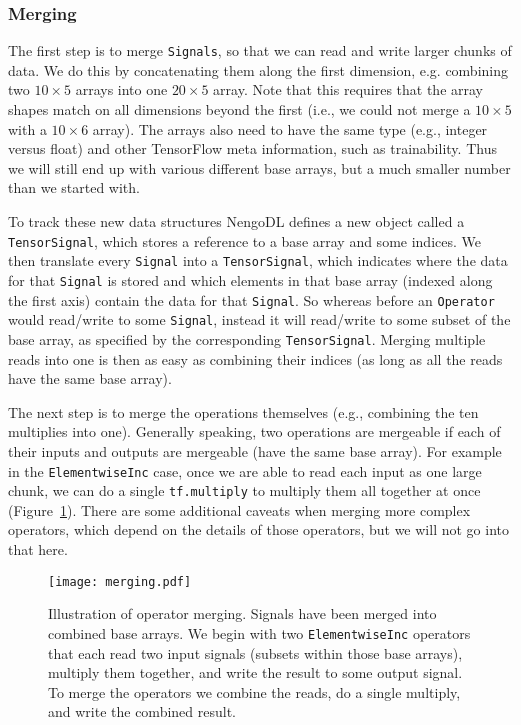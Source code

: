 \documentclass{article}
\begin{document}
\subsubsection{Merging}
\label{sec:merging}

The first step is to merge \texttt{Signals}, so that we can read and write larger chunks of data.  We do this by concatenating them along the first dimension, e.g. combining two $10 \times 5$ arrays into one $20 \times 5$ array.  Note that this requires that the array shapes match on all dimensions beyond the first (i.e., we could not merge a $10 \times 5$ with a $10 \times 6$ array).  The arrays also need to have the same type (e.g., integer versus float) and other TensorFlow meta information, such as trainability.  Thus we will still end up with various different base arrays, but a much smaller number than we started with.

To track these new data structures NengoDL defines a new object called a \texttt{TensorSignal}, which stores a reference to a base array and some indices.  We then translate every \texttt{Signal} into a \texttt{TensorSignal}, which indicates where the data for that \texttt{Signal} is stored and which elements in that base array (indexed along the first axis) contain the data for that \texttt{Signal}.  So whereas before an \texttt{Operator} would read/write to some \texttt{Signal}, instead it will read/write to some subset of the base array, as specified by the corresponding \texttt{TensorSignal}.  Merging multiple reads into one is then as easy as combining their indices (as long as all the reads have the same base array).

The next step is to merge the operations themselves (e.g., combining the ten multiplies into one).  Generally speaking, two operations are mergeable if each of their inputs and outputs are mergeable (have the same base array).  For example in the \texttt{ElementwiseInc} case, once we are able to read each input as one large chunk, we can do a single \texttt{tf.multiply} to multiply them all together at once (Figure~\ref{fig:merging}).  There are some additional caveats when merging more complex operators, which depend on the details of those operators, but we will not go into that here.

\begin{figure}
\centering
\texttt{[image: merging.pdf]}
\caption{Illustration of operator merging.  Signals have been merged into combined base arrays.  We begin with two \texttt{ElementwiseInc} operators that each read two input signals (subsets within those base arrays), multiply them together, and write the result to some output signal.  To merge the operators we combine the reads, do a single multiply, and write the combined result.}
\label{fig:merging}
\end{figure}
\end{document}
